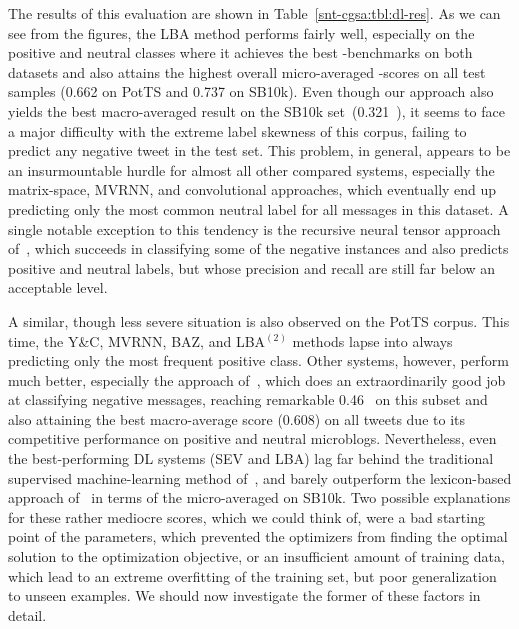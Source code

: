 The results of this evaluation are shown in
Table~\ref{snt-cgsa:tbl:dl-res}.  As we can see from the figures, the
LBA method performs fairly well, especially on the positive and
neutral classes where it achieves the best \F-benchmarks on both
datasets and also attains the highest overall micro-averaged \F-scores
on all test samples (0.662 on PotTS and 0.737 on SB10k).  Even though
our approach also yields the best macro-averaged result on the SB10k
set~(0.321~\F), it seems to face a major difficulty with the extreme
label skewness of this corpus, failing to predict any negative tweet
in the test set.  This problem, in general, appears to be an
insurmountable hurdle for almost all other compared systems,
especially the matrix-space, MVRNN, and convolutional approaches,
which eventually end up predicting only the most common neutral label
for all messages in this dataset.  A single notable exception to this
tendency is the recursive neural tensor approach of~\citet{Socher:13},
which succeeds in classifying some of the negative instances and also
predicts positive and neutral labels, but whose precision and recall
are still far below an acceptable level.

A similar, though less severe situation is also observed on the PotTS
corpus.  This time, the Y\&C, MVRNN, BAZ, and LBA$^{(2)}$ methods
lapse into always predicting only the most frequent positive class.
Other systems, however, perform much better, especially the approach
of~\citet{Severyn:15}, which does an extraordinarily good job at
classifying negative messages, reaching remarkable 0.46~\F{} on this
subset and also attaining the best macro-average score (0.608) on all
tweets due to its competitive performance on positive and neutral
microblogs.  Nevertheless, even the best-performing DL systems (SEV
and LBA) lag far behind the traditional supervised machine-learning
method of~\citet{Mohammad:13}, and barely outperform the lexicon-based
approach of~\citet{Hu:04} in terms of the micro-averaged \F{} on
SB10k.  Two possible explanations for these rather mediocre scores,
which we could think of, were a bad starting point of the parameters,
which prevented the optimizers from finding the optimal solution to
the optimization objective, or an insufficient amount of training
data, which lead to an extreme overfitting of the training set, but
poor generalization to unseen examples.  We should now investigate the
former of these factors in detail.


